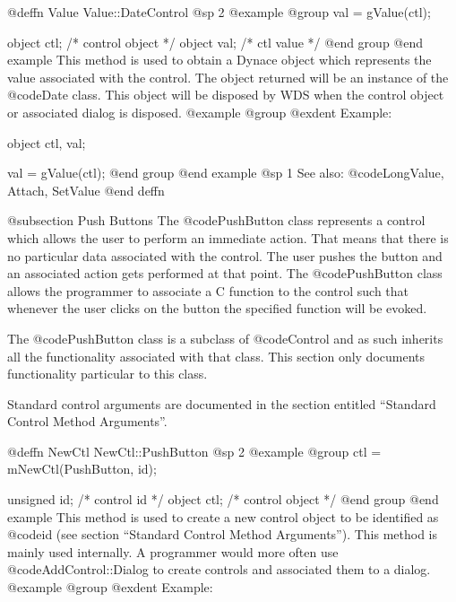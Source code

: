@deffn {Value} Value::DateControl
@sp 2
@example
@group
val = gValue(ctl);

object  ctl;   /*  control object  */
object  val;   /*  ctl value       */
@end group
@end example
This method is used to obtain a Dynace object which represents the value
associated with the control.  The object returned will be an instance of
the @code{Date} class.  This object will be disposed by WDS when the
control object or associated dialog is disposed.
@example
@group
@exdent Example:

object  ctl, val;

val = gValue(ctl);
@end group
@end example
@sp 1
See also:  @code{LongValue, Attach, SetValue}
@end deffn

















@subsection Push Buttons
The @code{PushButton} class represents a control which allows the user
to perform an immediate action.  That means that there is no particular
data associated with the control.  The user pushes the button and an
associated action gets performed at that point.  The @code{PushButton}
class allows the programmer to associate a C function to the control
such that whenever the user clicks on the button the specified function
will be evoked.

The @code{PushButton} class is a subclass of @code{Control} and as such
inherits all the functionality associated with that class.  This section
only documents functionality particular to this class.

Standard control arguments are documented in the section entitled
``Standard Control Method Arguments''.





@deffn {NewCtl} NewCtl::PushButton
@sp 2
@example
@group
ctl = mNewCtl(PushButton, id);

unsigned  id;   /*  control id      */
object   ctl;   /*  control object  */
@end group
@end example
This method is used to create a new control object to be identified as
@code{id} (see section ``Standard Control Method Arguments'').  This
method is mainly used internally.  A programmer would more often
use @code{AddControl::Dialog} to create controls and associated them
to a dialog.
@example
@group
@exdent Example:

